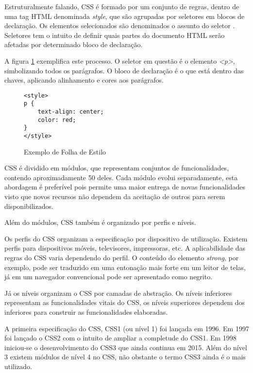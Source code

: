 Estruturalmente falando, CSS é formado por um conjunto de regras,
dentro de uma tag HTML denominada \textit{style}, que são agrupadas
por seletores em blocos de declaração. Os elementos selecionados são
denominados o assunto do seletor \autocite{cssSelectors}. Seletores tem
o intuito de definir quais partes do documento HTML serão afetadas por
determinado bloco de declaração.

A figura \ref{fig:CSSSample} exemplifica este processo. O seletor em
questão é o elemento \textit{<p>}, simbolizando todos os parágrafos. O bloco de
declaração é o que está dentro das chaves, aplicando alinhamento e
cores aos parágrafos.

\begin{figure}[H]
\centering
\begin{verbatim}
<style>
p {
    text-align: center;
    color: red;
}
</style>
\end{verbatim}
\caption{Exemplo de Folha de Estilo}
\label{fig:CSSSample}
\end{figure}

CSS é dividido em módulos, que representam conjuntos de
funcionalidades, contendo aproximadamente 50 deles. Cada módulo evolui
separadamente, esta abordagem é preferível pois permite uma maior
entrega de novas funcionalidades visto que novos recursos não dependem
da aceitação de outros para serem disponibilizados.

Além do módulos, CSS também é organizado por perfis e níveis.

Os perfis do CSS organizam a especificação por dispositivo de
utilização. Existem perfis para dispositivos móveis, televisores,
impressoras, etc. A aplicabilidade das regras do CSS varia dependendo do
perfil. O conteúdo do elemento \textit{strong}, por exemplo, pode ser
traduzido em uma entonação mais forte em um leitor de telas, já em um
navegador convencional pode ser apresentado como negrito.

Já os níveis organizam o CSS por camadas de abstração. Os níveis
inferiores representam as funcionalidades vitais do CSS, os níveis
superiores dependem dos inferiores para construir as funcionalidades
elaboradas. %

A primeira especificação do CSS, CSS1 (ou nível 1) foi lançada em
1996. Em 1997 foi lançado o CSS2 com o intuito de ampliar a completude
do CSS1. Em 1998 iniciou-se o desenvolvimento do CSS3 que ainda continua
em 2015. Além do nível 3 existem módulos de nível 4 no CSS, não
obstante o termo CSS3 ainda é o mais utilizado.

